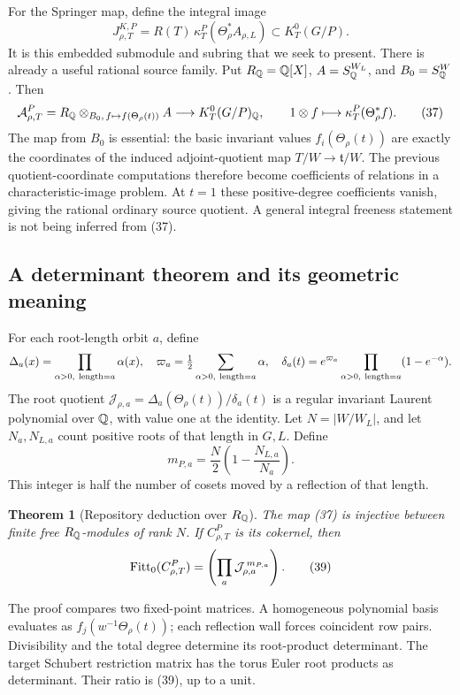 \documentclass[11pt,letterpaper]{article}
\newtheorem{theorem}{Theorem}[section]
\theoremstyle{definition}\newtheorem{definition}[theorem]{Definition}
\begin{document}
For the Springer map, define the integral image
\[
 J_{\rho,T}^{K,P}
 =R(T)\,\kappa_T^P(\Theta_\rho^*A_{\rho,L})
       \subset K_T^0(G/P).
 \tag{36}
\]
It is this embedded submodule and subring that we seek to present.
There is already a useful rational source family.
Put \(R_\mathbb Q=\mathbb Q[X]\), \(A=S_\mathbb Q^{W_L}\), and \(B_0=S_\mathbb Q^W\). Then
\[
 \mathcal A_{\rho,T}^P
 =R_\mathbb Q\otimes_{B_0,\,f\mapsto f(\Theta_\rho(t))}A
 \longrightarrow K_T^0(G/P)_\mathbb Q,\qquad
 1\otimes f\longmapsto\kappa_T^P(\Theta_\rho^*f).
 \tag{37}
\]
The map from \(B_0\) is essential: the basic invariant values
\(f_i(\Theta_\rho(t))\) are exactly the coordinates of the induced
adjoint-quotient map \(T/W\to\mathfrak t/W\).
The previous quotient-coordinate computations therefore become
coefficients of relations in a characteristic-image problem.
At \(t=1\) these positive-degree coefficients vanish, giving the
rational ordinary source quotient. A general integral freeness
statement is not being inferred from (37).

\subsection{A determinant theorem and its geometric meaning}
For each root-length orbit \(a\), define
\[
 \Delta_a(x)=\prod_{\alpha>0,\ {\rm length}=a}\alpha(x),\quad
 \varpi_a=\tfrac12\sum_{\alpha>0,\ {\rm length}=a}\alpha,\quad
 \delta_a(t)=e^{\varpi_a}\prod_{\alpha>0,\ {\rm length}=a}(1-e^{-\alpha}).
\]
The root quotient
\(\mathcal J_{\rho,a}=\Delta_a(\Theta_\rho(t))/\delta_a(t)\)
is a regular invariant Laurent polynomial over \(\mathbb Q\), with value
one at the identity. Let \(N=|W/W_L|\), and let \(N_a,N_{L,a}\)
count positive roots of that length in \(G,L\). Define
\[
 m_{P,a}=\frac N2\left(1-\frac{N_{L,a}}{N_a}\right).
 \tag{38}
\]
This integer is half the number of cosets moved by a reflection
of that length.

\begin{theorem}[Repository deduction over \(R_\mathbb Q\)]
The map (37) is injective between finite free \(R_\mathbb Q\)-modules of
rank \(N\). If \(C_{\rho,T}^P\) is its cokernel, then
\[
 \operatorname{Fitt}_0(C_{\rho,T}^P)
   =\left(\prod_a\mathcal J_{\rho,a}^{\,m_{P,a}}\right).
 \tag{39}
\]
\end{theorem}
The proof compares two fixed-point matrices. A homogeneous polynomial
basis evaluates as \(f_j(w^{-1}\Theta_\rho(t))\); each reflection
wall forces coincident row pairs. Divisibility and the total degree
determine its root-product determinant. The target Schubert
restriction matrix has the torus Euler root products as determinant.
Their ratio is (39), up to a unit.
\end{document}

